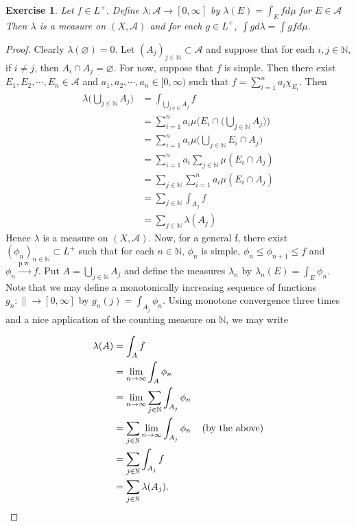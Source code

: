 \documentclass[12pt]{amsart}
\newtheorem{ex}[thm]{Exercise}
\newcommand{\lam}{\lambda}
\newcommand{\N}{\mathbb{N}}
\newcommand{\MA}{\mathcal{A}}
\newcommand{\RG}{[0,\infty]}
\newcommand{\Rg}{[0,\infty)}
\newcommand{\limn}{\lim \limits_{n \rightarrow \infty}}
\begin{document}
	\begin{ex}
		Let $f \in L^+$. Define $\lam: \MA \rightarrow \RG$ by $\lam(E) = \int_E f d\mu$ for $E \in \MA$
		Then $\lam$ is a measure on $(X, \MA)$ and for each $g \in L^+$, $\int g d\lam = \int g f d\mu$.
	\end{ex}
	
	\begin{proof}
		Clearly $\lam(\varnothing) = 0$. Let $(A_j)_{j \in \N} \subset \MA$ and suppose that for each $i, j \in \N$, if $i \neq j$, then $A_i \cap A_j = \varnothing$. For now, suppose that $f$ is simple. Then there exist $E_1, E_2, \cdots, E_n \in \MA$ and  $a_1, a_2, \cdots, a_n \in \Rg$ such that $f = \sum\limits_{i=1}^n a_i \chi_{E_i}$.  Then 
		\begin{align*}
			\lam\bigg(\bigcup_{j \in \N} A_j\bigg) 
			&= \int_{\bigcup_{j \in \N} A_j} f\\
			&= \sum_{i = 1} ^n a_i\mu\bigg(E_i \cap \bigg(\bigcup_{j \in \N} A_j\bigg)\bigg)\\
			&= \sum_{i = 1} ^n a_i\mu\bigg(\bigcup_{j \in \N} E_i \cap A_j\bigg)\\
			&= \sum_{i = 1} ^n a_i \sum_{j \in \N} \mu(E_i \cap A_j)\\
			&= \sum_{j \in \N} \sum_{i = 1} ^n a_i \mu(E_i \cap A_j)\\
			&= \sum_{j \in \N} \int_{A_j} f\\
			&= \sum_{j \in \N} \lam(A_j)
		\end{align*} 
		Hence $\lam$ is a measure on $(X, \MA)$. Now, for a general f, there exist $(\phi_n)_{n \in \N} \subset L^+$ such that for each $n \in \N$, $\phi_n$ is simple, $\phi_n \leq \phi_{n+1} \leq f$ and $\phi_n \xrightarrow{\text{p.w.}} f$. Put $A = \bigcup_{j \in \N}A_j$ and define the measures $\lam_n$ by $\lam_n(E) = \int_E \phi_n$. Note that we may define a monotonically increasing sequence of functions $g_n: \|\rightarrow \RG$ by $g_n(j) = \int_{A_j} \phi_n$. Using monotone convergence three times and a nice application of the counting measure on $\N$, we may write
		
		\begin{align*}
			\lam(A) 
			&= \int_A f\\
			&= \limn \int_A \phi_n\\
			&= \limn \sum_{j \in \N} \int_{A_j} \phi_n\\
			&= \sum_{j \in \N} \limn \int_{A_j} \phi_n \hspace{4mm} \text{(by the above)}\\
			&= \sum_{j \in \N} \int_{A_j} f\\
			&= \sum_{j \in \N} \lam(A_j).
		\end{align*} 
		

\end{proof}
\end{document}
